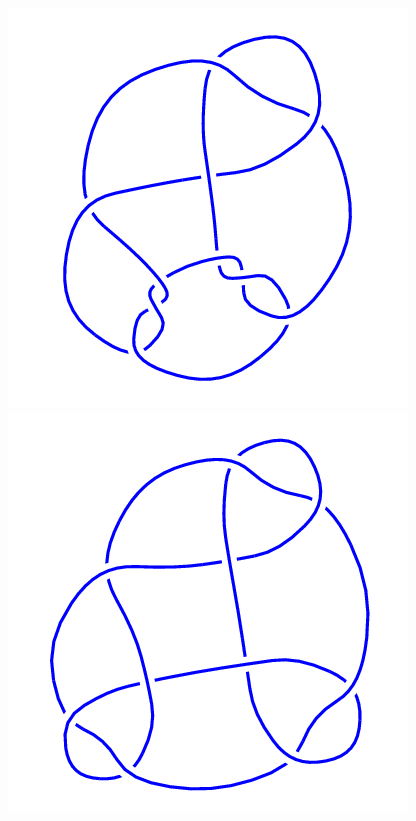 \begin{figure}[H]
\begin{minipage}[b]{.18\linewidth}
	\end{minipage}
	\begin{minipage}[b]{.18\linewidth}
		\centering
		\includegraphics[width=\linewidth]{../data/10_74.png}
	\end{minipage}
	\begin{minipage}[b]{.18\linewidth}
		\centering
		\includegraphics[width=\linewidth]{../data/10_75.png}

\end{minipage}
\end{figure}
